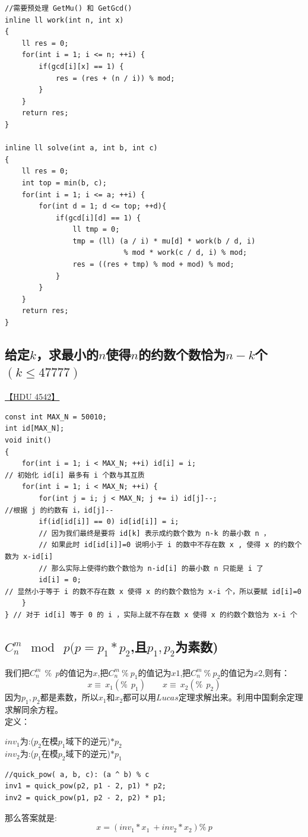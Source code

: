 \begin{lstlisting}
//需要预处理 GetMu() 和 GetGcd()
inline ll work(int n, int x)
{
	ll res = 0;
	for(int i = 1; i <= n; ++i) {
		if(gcd[i][x] == 1) {
			res = (res + (n / i)) % mod;
		}
	}
	return res;
}

inline ll solve(int a, int b, int c)
{
	ll res = 0;
	int top = min(b, c);
	for(int i = 1; i <= a; ++i) {
		for(int d = 1; d <= top; ++d){
			if(gcd[i][d] == 1) {
				ll tmp = 0;
				tmp = (ll) (a / i) * mu[d] * work(b / d, i)
                            % mod * work(c / d, i) % mod;
				res = ((res + tmp) % mod + mod) % mod;
			}
		}
	}
	return res;
}
\end{lstlisting}

\subsection{给定$k$，求最小的$n$使得$n$的约数个数恰为$n-k$个$(k\leq 47777)$}
\underline {【HDU 4542】}

\begin{lstlisting}
const int MAX_N = 50010;
int id[MAX_N];
void init()
{
	for(int i = 1; i < MAX_N; ++i) id[i] = i;
// 初始化 id[i] 最多有 i 个数与其互质
	for(int i = 1; i < MAX_N; ++i) {
		for(int j = i; j < MAX_N; j += i) id[j]--;
//根据 j 的约数有 i，id[j]--
		if(id[id[i]] == 0) id[id[i]] = i;
		// 因为我们最终是要将 id[k] 表示成约数个数为 n-k 的最小数 n ，
        // 如果此时 id[id[i]]=0 说明小于 i 的数中不存在数 x , 使得 x 的约数个数为 x-id[i]
        // 那么实际上使得约数个数恰为 n-id[i] 的最小数 n 只能是 i 了
		id[i] = 0;
// 显然小于等于 i 的数不存在数 x 使得 x 的约数个数恰为 x-i 个，所以要赋 id[i]=0
	}
} // 对于 id[i] 等于 0 的 i ，实际上就不存在数 x 使得 x 的约数个数恰为 x-i 个
\end{lstlisting}

\subsection{$C_{n}^{m}\mod \ p(p=p_1*p_2$,且$p_1,p_2$为素数)}

我们把$C_{n}^{m}\ \ \% \ \ p$的值记为$x$,把$C_{n}^{m}\ \%\  p_1$的值记为$x1$,把$C_{n}^{m}\ \%\  p_2$的值记为$x2$,则有： \\
$$x \equiv \ x_1(\% \ \ p_1)\qquad x \equiv \ x_2(\% \ \ p_2)$$
因为$p_1,p_2$都是素数，所以$x_1$和$x_2$都可以用$Lucas$定理求解出来。利用中国剩余定理求解同余方程。\\
定义：
\begin{center}
$inv_1$为:($p_2$在模$p_1$域下的逆元)$*p_2$\\
$inv_2$为:($p_1$在模$p_2$域下的逆元)$*p_1$
\end{center}

\begin{lstlisting}
//quick_pow( a, b, c): (a ^ b) % c
inv1 = quick_pow(p2, p1 - 2, p1) * p2;
inv2 = quick_pow(p1, p2 - 2, p2) * p1;
\end{lstlisting}
那么答案就是:\\
$$x=(inv_1*x_1\ + inv_2 * x_2)\% \ p$$

%
